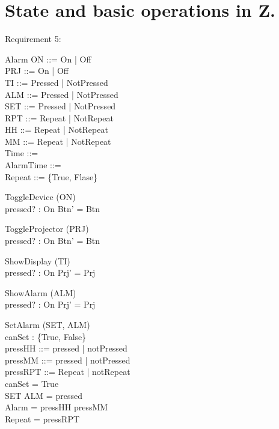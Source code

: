\documentclass[Main_Assignment2]{subfiles}
\begin{document}
\section{State and basic operations in Z.}

Requirement 5:

\begin{schema}{Alarm}
ON ::= On | Off  \\
PRJ ::= On | Off \\
TI ::= Pressed | NotPressed \\
ALM ::= Pressed | NotPressed \\
SET ::= Pressed | NotPressed \\
RPT ::= Repeat | NotRepeat \\
HH ::= Repeat | NotRepeat \\
MM ::= Repeat | NotRepeat \\
Time ::=  \\
AlarmTime ::=  \\
Repeat ::= \{True, Flase\}
\end{schema}


\begin{schema}{ToggleDevice} %
\Delta (ON) \\
pressed? : On
\where
Btn' = Btn 
\end{schema}


\begin{schema}{ToggleProjector} %
\Delta (PRJ) \\
pressed? : On
\where
Btn' = Btn 
\end{schema}


\begin{schema}{ShowDisplay} %
\Delta (TI) \\
pressed? : On
\where
Prj' = Prj 
\end{schema}


\begin{schema}{ShowAlarm} %
\Delta (ALM) \\
pressed? : On
\where
Prj' = Prj 
\end{schema}

\begin{schema}{SetAlarm} %
\Delta (SET, ALM) \\
canSet : \{True, False\} \\
pressHH ::= pressed | notPressed \\
pressMM ::= pressed | notPressed \\
pressRPT ::= Repeat | notRepeat \\
\where
canSet = True \Rightarrow \\
\hspace{20pt} SET \wedge ALM = pressed \\
Alarm = pressHH \cup pressMM \\
Repeat = pressRPT
\end{schema}
\end{document}
